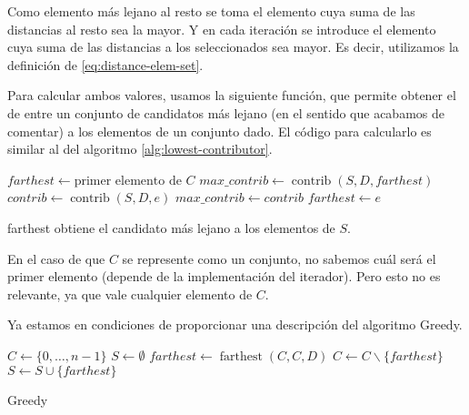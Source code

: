 \documentclass{article}
\begin{document}
Como elemento más lejano al resto se toma el elemento cuya suma de las distancias al resto sea la mayor. Y en cada iteración se introduce el elemento
cuya suma de las distancias a los seleccionados sea mayor. Es decir, utilizamos la definición de \eqref{eq:distance-elem-set}.

Para calcular ambos valores, usamos la siguiente función, que permite obtener el de entre
un conjunto de candidatos más lejano (en el sentido que acabamos de comentar) a los elementos de un conjunto dado.
El código para calcularlo es similar al del algoritmo \ref{alg:lowest-contributor}.

\begin{algorithm}[H]
	\DontPrintSemicolon %
	$farthest \gets \text{primer elemento de } C$\;
	$max\_contrib \gets \operatorname{contrib}(S,D,farthest)$\;
	 {
		$contrib \gets \operatorname{contrib}(S,D,e)$\;
		 { 
			$max\_contrib \gets contrib$\;
			$farthest \gets e$ 
		}
	}
	\;
	\caption{{\sc farthest} obtiene el candidato más lejano a los elementos de $S$.}
	\label{alg:farthest-candidate-set}
\end{algorithm}

En el caso de que $C$ se represente como un conjunto, no sabemos cuál será el primer elemento (depende de la implementación del iterador). Pero
esto no es relevante, ya que vale cualquier elemento de $C$.

Ya estamos en condiciones de proporcionar una descripción del algoritmo Greedy.

\begin{algorithm}[H]
	\DontPrintSemicolon %
	$C \gets \{0,\ldots, n-1\}$ 
	$S \gets \emptyset$ 
	$farthest \gets \operatorname{farthest}(C,C,D)$ 
	$C \gets C\backslash \{farthest\}$\;
	$S \gets S\cup \{farthest\}$\;
	\;
	\;
	\caption{{\sc Greedy}}
	\label{alg:greedy}
\end{algorithm}
\end{document}
